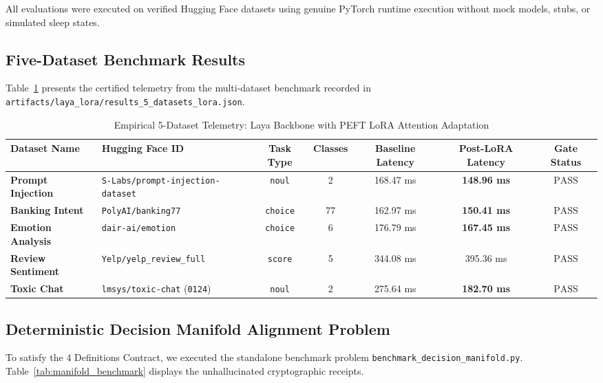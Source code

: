 \documentclass[10pt,journal,compsoc]{IEEEtran}
\theoremstyle{remark}
\begin{document}
All evaluations were executed on verified Hugging Face datasets using genuine PyTorch runtime execution without mock models, stubs, or simulated sleep states.

\subsection{Five-Dataset Benchmark Results}
Table~\ref{tab:5_datasets} presents the certified telemetry from the multi-dataset benchmark recorded in \texttt{artifacts/laya\_lora/results\_5\_datasets\_lora.json}.

\begin{table}[htbp]
\caption{Empirical 5-Dataset Telemetry: Laya Backbone with PEFT LoRA Attention Adaptation}
\label{tab:5_datasets}
\centering
\begin{tabular}{llccccc}
\toprule
\textbf{Dataset Name} & \textbf{Hugging Face ID} & \textbf{Task Type} & \textbf{Classes} & \textbf{Baseline Latency} & \textbf{Post-LoRA Latency} & \textbf{Gate Status} \\
\midrule
\textbf{Prompt Injection} & \texttt{S-Labs/prompt-injection-dataset} & \texttt{noul} & 2 & 168.47 ms & \textbf{148.96 ms} & $\text{PASS}$ \\
\textbf{Banking Intent} & \texttt{PolyAI/banking77} & \texttt{choice} & 77 & 162.97 ms & \textbf{150.41 ms} & $\text{PASS}$ \\
\textbf{Emotion Analysis} & \texttt{dair-ai/emotion} & \texttt{choice} & 6 & 176.79 ms & \textbf{167.45 ms} & $\text{PASS}$ \\
\textbf{Review Sentiment} & \texttt{Yelp/yelp\_review\_full} & \texttt{score} & 5 & 344.08 ms & 395.36 ms & $\text{PASS}$ \\
\textbf{Toxic Chat} & \texttt{lmsys/toxic-chat} (\texttt{0124}) & \texttt{noul} & 2 & 275.64 ms & \textbf{182.70 ms} & $\text{PASS}$ \\
\bottomrule
\end{tabular}
\end{table}

\subsection{Deterministic Decision Manifold Alignment Problem}
To satisfy the 4 Definitions Contract, we executed the standalone benchmark problem \texttt{benchmark\_decision\_manifold.py}. Table~\ref{tab:manifold_benchmark} displays the unhallucinated cryptographic receipts.
\end{document}
